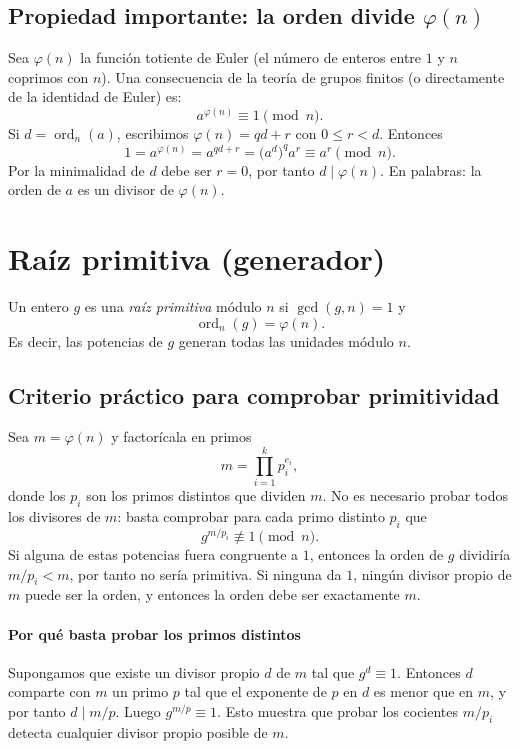 \documentclass[12pt]{article}
\begin{document}
\subsection{Propiedad importante: la orden divide $\varphi(n)$}
Sea $\varphi(n)$ la función totiente de Euler (el número de enteros entre $1$ y $n$ coprimos con $n$). Una consecuencia de la teoría de grupos finitos (o directamente de la identidad de Euler) es:
\[a^{\varphi(n)}\equiv1\pmod n.\]
Si $d=\operatorname{ord}_n(a)$, escribimos $\varphi(n)=qd+r$ con $0\le r<d$. Entonces
\[1=a^{\varphi(n)}=a^{qd+r}=\bigl(a^d\bigr)^q a^r\equiv a^r\pmod n.\]
Por la minimalidad de $d$ debe ser $r=0$, por tanto $d\mid\varphi(n)$. En palabras: la orden de $a$ es un divisor de $\varphi(n)$.

\section{Raíz primitiva (generador)}
\begin{definition}
Un entero $g$ es una \emph{raíz primitiva} módulo $n$ si $\gcd(g,n)=1$ y
\[\operatorname{ord}_n(g)=\varphi(n).\]
Es decir, las potencias de $g$ generan todas las unidades módulo $n$.
\end{definition}

\subsection{Criterio práctico para comprobar primitividad}
Sea $m=\varphi(n)$ y factorícala en primos
\[m=\prod_{i=1}^k p_i^{e_i},\]
donde los $p_i$ son los primos distintos que dividen $m$. No es necesario probar todos los divisores de $m$: basta comprobar para cada primo distinto $p_i$ que
\[g^{m/p_i}\not\equiv1\pmod n.\]
Si alguna de estas potencias fuera congruente a $1$, entonces la orden de $g$ dividiría $m/p_i<m$, por tanto no sería primitiva. Si ninguna da $1$, ningún divisor propio de $m$ puede ser la orden, y entonces la orden debe ser exactamente $m$.

\paragraph{Por qué basta probar los primos distintos} Supongamos que existe un divisor propio $d$ de $m$ tal que $g^d\equiv1$. Entonces $d$ comparte con $m$ un primo $p$ tal que el exponente de $p$ en $d$ es menor que en $m$, y por tanto $d\mid m/p$. Luego $g^{m/p}\equiv1$. Esto muestra que probar los cocientes $m/p_i$ detecta cualquier divisor propio posible de $m$.
\end{document}
